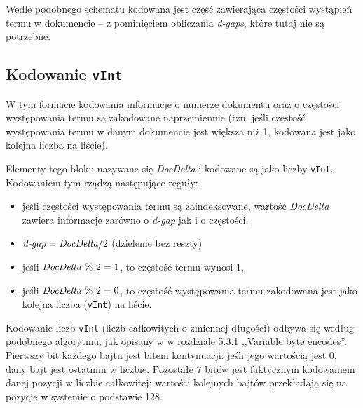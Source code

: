 Wedle podobnego schematu kodowana jest część zawierająca częstości wystąpień termu w dokumencie -- z pominięciem obliczania \emph{d-gaps}, które tutaj nie są potrzebne.

\subsection{Kodowanie \texttt{vInt}}
\label{sec:vIntEncoding}

W tym formacie kodowania informacje o numerze dokumentu oraz o częstości występowania termu są zakodowane naprzemiennie (tzn. jeśli częstość występowania termu w danym dokumencie jest większa niż 1, kodowana jest jako kolejna liczba na liście). 

Elementy tego bloku nazywane się \emph{DocDelta} i kodowane są jako liczby \texttt{vInt}. Kodowaniem tym rządzą następujące reguły:
\begin{itemize}
 \item jeśli częstości występowania termu są zaindeksowane, wartość \emph{DocDelta} zawiera informacje zarówno o \emph{d-gap} jak i o częstości,
 \item $\emph{d-gap} = \emph{DocDelta} / 2$ (dzielenie bez reszty)
 \item jeśli $\emph{DocDelta}~\%~2 = 1$, to częstość termu wynosi 1,
 \item jeśli $\emph{DocDelta}~\%~2 = 0$, to częstość występowania termu zakodowana jest jako kolejna liczba (\texttt{vInt}) na liście.
\end{itemize}

Kodowanie liczb \texttt{vInt} (liczb całkowitych o zmiennej długości) odbywa się według podobnego algorytmu, jak opisany w \cite{irbook} w rozdziale 5.3.1 ,,Variable byte encodes''. Pierwszy bit każdego bajtu jest bitem kontynuacji: jeśli jego wartością jest 0, dany bajt jest ostatnim w liczbie. Pozostałe 7 bitów jest faktycznym kodowaniem danej pozycji w liczbie całkowitej: wartości kolejnych bajtów przekładają się na pozycje w systemie o podstawie 128.